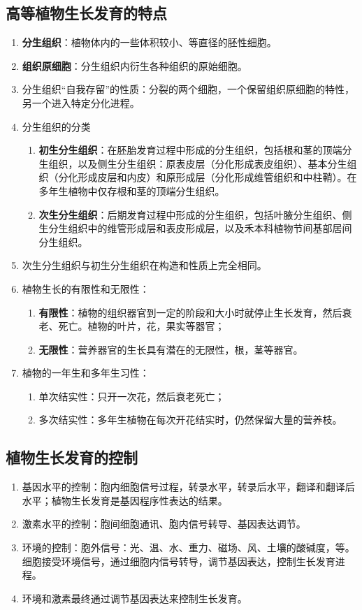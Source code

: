 \subsection{高等植物生长发育的特点}
\begin{enumerate}
    \item \textbf{分生组织}：植物体内的一些体积较小、等直径的胚性细胞。
    \item \textbf{组织原细胞}：分生组织内衍生各种组织的原始细胞。
    \item 分生组织“自我存留”的性质：分裂的两个细胞，一个保留组织原细胞的特性，另一个进入特定分化进程。
    \item 分生组织的分类
    \begin{enumerate}
        \item \textbf{初生分生组织}：在胚胎发育过程中形成的分生组织，包括根和茎的顶端分生组织，以及侧生分生组织：原表皮层（分化形成表皮组织）、基本分生组织（分化形成皮层和内皮）和原形成层（分化形成维管组织和中柱鞘）。在多年生植物中仅存根和茎的顶端分生组织。
        \item \textbf{次生分生组织}：后期发育过程中形成的分生组织，包括叶腋分生组织、侧生分生组织中的维管形成层和表皮形成层，以及禾本科植物节间基部居间分生组织。
    \end{enumerate}
    \item 次生分生组织与初生分生组织在构造和性质上完全相同。
    \item 植物生长的有限性和无限性：
    \begin{enumerate}
        \item \textbf{有限性}：植物的组织器官到一定的阶段和大小时就停止生长发育，然后衰老、死亡。植物的叶片，花，果实等器官；
        \item \textbf{无限性}：营养器官的生长具有潜在的无限性，根，茎等器官。
    \end{enumerate}
    \item 植物的一年生和多年生习性：
    \begin{enumerate}
        \item 单次结实性：只开一次花，然后衰老死亡；
        \item 多次结实性：多年生植物在每次开花结实时，仍然保留大量的营养枝。
    \end{enumerate}
\end{enumerate}
\subsection{植物生长发育的控制}
\begin{enumerate}
    \item 基因水平的控制：胞内细胞信号过程，转录水平，转录后水平，翻译和翻译后水平；植物生长发育是基因程序性表达的结果。
    \item 激素水平的控制：胞间细胞通讯、胞内信号转导、基因表达调节。
    \item 环境的控制：胞外信号：光、温、水、重力、磁场、风、土壤的酸碱度，等。细胞接受环境信号，通过细胞内信号转导，调节基因表达，控制生长发育进程。
    \item 环境和激素最终通过调节基因表达来控制生长发育。
\end{enumerate}

